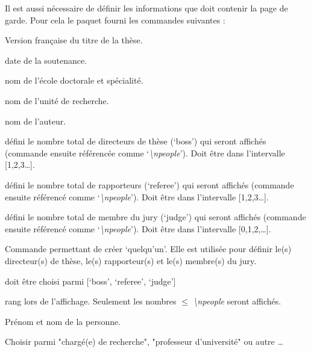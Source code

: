 \documentclass{scrartcl}
\makeatletter
\newcommand*{\cs}[1]{\texttt{\textbackslash#1}}
\newcommand*{\cmd}[1]{\cs{\expandafter\@gobble\string#1}}
\newcommand*{\cmdarg}[1]{\{<\textit{#1}>\}}
\makeatother
\begin{document}
Il est aussi n\'ecessaire de d\'efinir les informations que doit contenir la page de garde.
Pour cela le paquet fourni les commandes suivantes :
\begin{description}
    \renewcommand{\makelabel}[1]{#1}
	\item[\cmd{\FRtitle}\cmdarg{titre}] Version fran\c{c}aise du titre de la th\`ese.
	\item[\cmd{\defencedate}\cmdarg{date}] date de la soutenance.
	\item[\cmd{\docschool}\cmdarg{nom}] nom de l'\'ecole doctorale et sp\'ecialit\'e.
	\item[\cmd{\lab}\cmdarg{laboratoire}] nom de l'unit\'e de recherche.
	\item[\cmd{\author}\cmdarg{nom}] nom de l'auteur.
    \item[\cmd{\nboss}\cmdarg{entier}] d\'efini le nombre total de directeurs de th\`ese (`boss')
      qui seront affich\'es (commande ensuite r\'ef\'erenc\'ee comme `\textit{\textbackslash npeople}'). Doit être dans l'intervalle [1,2,3\ldots].
    \item[\cmd{\nreferee}\cmdarg{entier}] d\'efini le nombre total de rapporteurs (`referee')
        qui seront affich\'es (commande ensuite r\'ef\'erenc\'e comme `\textit{\textbackslash npeople}'). Doit être dans l'intervalle [1,2,3\ldots].
    \item[\cmd{\njudge}\cmdarg{entier}] d\'efini le nombre total de membre du jury (`judge')
        qui seront affich\'es (commande ensuite r\'ef\'erenc\'e comme `\textit{\textbackslash npeople}').  Doit être dans l'intervalle [0,1,2,\ldots].
	\item[\cmd{\makesomeone}\cmdarg{cat\'egorie}\cmdarg{nombre}\cmdarg{nom}\cmdarg{status}\cmdarg{autre}] Commande permettant de cr\'eer `quelqu'un'. Elle est utilis\'ee pour d\'efinir le(s) directeur(s) de th\`ese, le(s) rapporteur(s) et le(s) membre(s) du jury.
        \begin{description}
            \renewcommand{\makelabel}[1]{\textit{#1}}
            \item[<cat\'egorie>] doit \^etre choisi parmi [`boss', `referee', `judge']
            \item[<nombre>] rang lors de l'affichage. 
                Seulement les nombres $\le$ \textit{\textbackslash npeople} seront affich\'es.
            \item[<nom>] Pr\'enom et nom de la personne.
            \item[<status>] Choisir parmi "charg\'e(e) de recherche", "professeur d'universit\'e" ou autre \ldots

\end{description}
\end{description}
\end{document}
